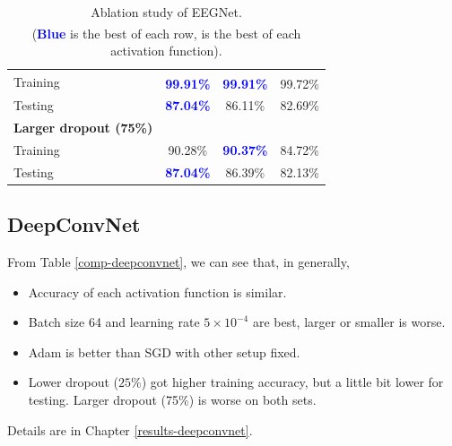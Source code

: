 \begin{table}[htbp]
{\begin{tabular}{l|ccc}
				Training & \textcolor{blue}{\textbf{99.91\%}}\textsuperscript{\textdagger} & \textcolor{blue}{\textbf{99.91\%}}\textsuperscript{\textdagger} & 99.72\%\textsuperscript{\textdagger} \\ 
				Testing & \textcolor{blue}{\textbf{87.04\%}} & 86.11\% & 82.69\% \\
				\Xhline{3\arrayrulewidth}
				\textbf{Larger dropout (75\%)} & & & \\
				Training & 90.28\% & \textcolor{blue}{\textbf{90.37\%}} & 84.72\% \\ 
				Testing & \textcolor{blue}{\textbf{87.04\%}} & 86.39\% & 82.13\% \\
				\hline
			\end{tabular}}
			\caption{Ablation study of EEGNet. \\ (\textcolor{blue}{\textbf{Blue}} is the best of each row, \textsuperscript{\textdagger} is the best of each activation function).}
			\label{comp-eegnet}
		\end{table}

\subsection{DeepConvNet}
	From Table \ref{comp-deepconvnet}, we can see that, in generally, 
	\begin{itemize}
		\item Accuracy of each activation function is similar.
		\item Batch size 64 and learning rate $5 \times 10^{-4}$ are best, larger or smaller is worse.
		\item Adam is better than SGD with other setup fixed.
		\item Lower dropout ($25\%$) got higher training accuracy, but a little bit lower for testing. Larger dropout (75\%) is worse on both sets.
	\end{itemize}
	Details are in Chapter \ref{results-deepconvnet}.
	
